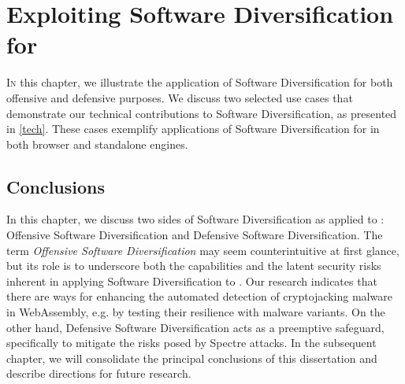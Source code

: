 \chapter{Exploiting Software Diversification for \Wasm}
\label{exploit}
\lettrine[lines=4]{I}{n} this chapter, we illustrate the application of Software Diversification for both offensive and defensive purposes.
We discuss two selected use cases that demonstrate our technical contributions to Software Diversification, as presented in \autoref{tech}.
These cases exemplify applications of Software Diversification for \Wasm in both browser and standalone engines.







% 

\section*{Conclusions}

In this chapter, we discuss two sides of Software Diversification as applied to \Wasm: Offensive Software Diversification and Defensive Software Diversification.
The term \emph{Offensive Software Diversification} may seem counterintuitive at first glance, but its role is to underscore both the capabilities and the latent security risks inherent in applying Software Diversification to \Wasm.
Our research indicates that there are ways for enhancing the automated detection of cryptojacking malware in WebAssembly, e.g. by testing their resilience with \Wasm malware variants.
On the other hand, Defensive Software Diversification acts as a preemptive safeguard, specifically to mitigate the risks posed by Spectre attacks.
In the subsequent chapter, we will consolidate the principal conclusions of this dissertation and describe directions for future research.